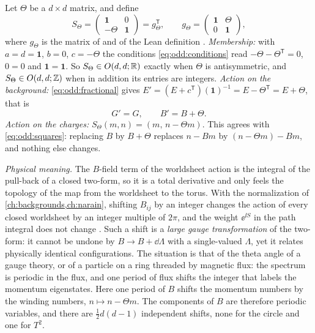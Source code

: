 Let $\Theta$ be a $d\times d$ matrix, and define
\begin{equation}\label{eq:odd:shift}
 S_\Theta=\begin{pmatrix}\mathbf 1&0\\-\Theta&\mathbf 1\end{pmatrix}
 =g_\Theta^{\mathsf T},\qquad
 g_\Theta=\begin{pmatrix}\mathbf 1&\Theta\\0&\mathbf 1\end{pmatrix},
\end{equation}
where $g_\Theta$ is the matrix of  and of
the Lean definition . \emph{Membership:} with $a=d=\mathbf 1$, $b=0$,
$c=-\Theta$ the conditions \eqref{eq:odd:conditions} read $-\Theta-\Theta^{\mathsf T}=0$,
$0=0$ and $\mathbf 1=\mathbf 1$. So $S_\Theta\in O(d,d;\mathbb{R})$ exactly when $\Theta$ is
antisymmetric, and $S_\Theta\in O(d,d;\mathbb{Z})$ when in addition its entries are integers.
\emph{Action on the background:} \eqref{eq:odd:fractional} gives
$E'=(E+c^{\mathsf T})(\mathbf 1)^{-1}=E-\Theta^{\mathsf T}=E+\Theta$, that is
\begin{equation}\label{eq:odd:shiftaction}
 G'=G,\qquad B'=B+\Theta .
\end{equation}
\emph{Action on the charges:} $S_\Theta(m,n)=(m,\,n-\Theta m)$. This agrees with
\eqref{eq:odd:squares}: replacing $B$ by $B+\Theta$ replaces $n-Bm$ by $(n-\Theta m)-Bm$,
and nothing else changes.

\emph{Physical meaning.} The $B$-field term of the worldsheet action is the integral of the
pull-back of a closed two-form, so it is a total derivative and only feels the topology of
the map from the worldsheet to the torus. With the normalization of
\cref{ch:backgrounds,ch:narain}, shifting $B_{ij}$ by an integer changes the action of
every closed worldsheet by an integer multiple of $2\pi$, and the weight $\ee^{\ii S}$ in the
path integral does not change . Such a shift is a
\emph{large gauge transformation} of the two-form: it
cannot be undone by $B\to B+\dd\Lambda$ with a single-valued $\Lambda$, yet it relates
physically identical configurations. The situation is that of the theta angle of a gauge
theory, or of a particle on a ring threaded by magnetic flux: the spectrum is periodic in
the flux, and one period of flux shifts the integer that labels the momentum eigenstates.
Here one period of $B$ shifts the momentum numbers by the winding numbers,
$n\mapsto n-\Theta m$. The components of $B$ are therefore periodic variables, and there
are $\frac12d(d-1)$ independent shifts, none for the circle and one for $T^2$.

